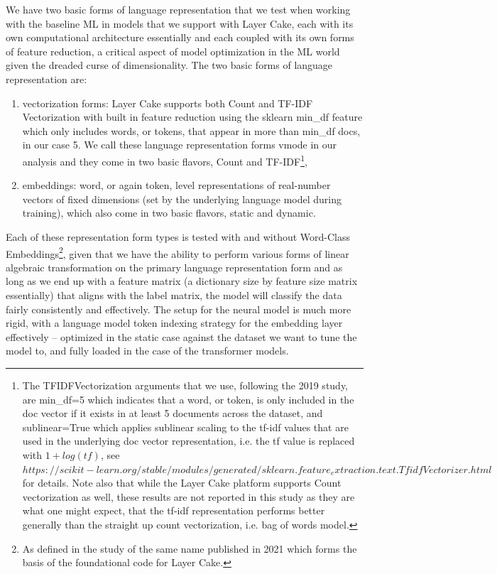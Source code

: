 \documentclass[final]{clv2025}
\begin{document}
We have two basic forms of language representation that we test when working with the baseline ML in models that we support with Layer Cake, each with its own computational architecture essentially and each coupled with its own forms of feature reduction, a critical aspect of model optimization in the ML world given the dreaded curse of dimensionality.  The two basic forms of language representation are:
\begin{enumerate}
    \item vectorization forms: Layer Cake supports both Count and TF-IDF Vectorization with built in feature reduction using the sklearn min\_df feature which only includes words, or tokens, that appear in more than min\_df docs, in our case 5. We call these language representation forms vmode in our analysis and they come in two basic flavors, Count and TF-IDF\footnote{The TFIDFVectorization arguments that we use, following the 2019 study, are min\_df=5 which indicates that a word, or token, is only included in the doc vector if it exists in at least 5 documents across the dataset, and sublinear=True which applies sublinear scaling to the tf-idf values that are used in the underlying doc vector representation, i.e. the tf value is replaced with $1+log(tf)$, see $https://scikit-learn.org/stable/modules/generated/sklearn.feature_extraction.text.TfidfVectorizer.html$ for details. Note also that while the Layer Cake platform supports Count vectorization as well, these results are not reported in this study as they are what one might expect, that the tf-idf representation performs better generally than the straight up count vectorization, i.e. bag of words model.}, 
    \item embeddings: word, or again token, level representations of real-number vectors of fixed dimensions (set by the underlying language model during training), which also come in two basic flavors, static and dynamic. 
\end{enumerate}
Each of these representation form types is tested with and without Word-Class Embeddings\footnote{As defined in the study of the same name published in 2021 \cite{moreo} which forms the basis of the foundational code for Layer Cake.}, given that we have the ability to perform various forms of linear algebraic transformation on the primary language representation form and as long as we end up with a feature matrix  (a  dictionary size by feature size matrix essentially) that aligns with the label matrix, the model will classify the data fairly consistently and effectively. The setup for the neural model is much more rigid, with a language model token indexing strategy for the embedding layer effectively – optimized in the static case against the dataset we want to tune the model to, and fully loaded in the case of the transformer models.   
\end{document}
